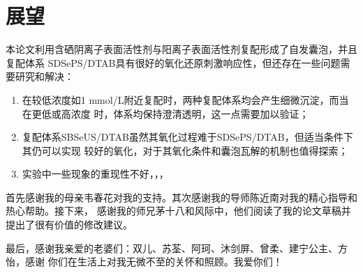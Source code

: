 \documentclass[bachelor,winfonts,replaceperiod]{jnuthesis}
\begin{document}
    \section{展望}
    本论文利用含硒阴离子表面活性剂与阳离子表面活性剂复配形成了自发囊泡，并且复配体系
    SDSePS/DTAB具有很好的氧化还原刺激响应性，但还存在一些问题需要研究和解决：
    \begin{enumerate}
        \item 在较低浓度如1 mmol/L附近复配时，两种复配体系均会产生细微沉淀，而当在更低或高浓度
        时，体系均保持澄清透明，这一点需要加以验证；
        \item 复配体系SBSeUS/DTAB虽然其氧化过程难于SDSePS/DTAB，但适当条件下其仍可以实现
        较好的氧化，对于其氧化条件和囊泡瓦解的机制也值得探索；
        \item 实验中一些现象的重现性不好，，，
    \end{enumerate}
    
    \begin{backmatter}
    
    \end{backmatter}

    \begin{acknowledgement}
        首先感谢我的母亲韦春花对我的支持。其次感谢我的导师陈近南对我的精心指导和热心帮助。接下来，
        感谢我的师兄茅十八和风际中，他们阅读了我的论文草稿并提出了很有价值的修改建议。
        
        最后，感谢我亲爱的老婆们：双儿、苏荃、阿珂、沐剑屏、曾柔、建宁公主、方怡，感谢
        你们在生活上对我无微不至的关怀和照顾。我爱你们！
    \end{acknowledgement}
    
\end{document}
